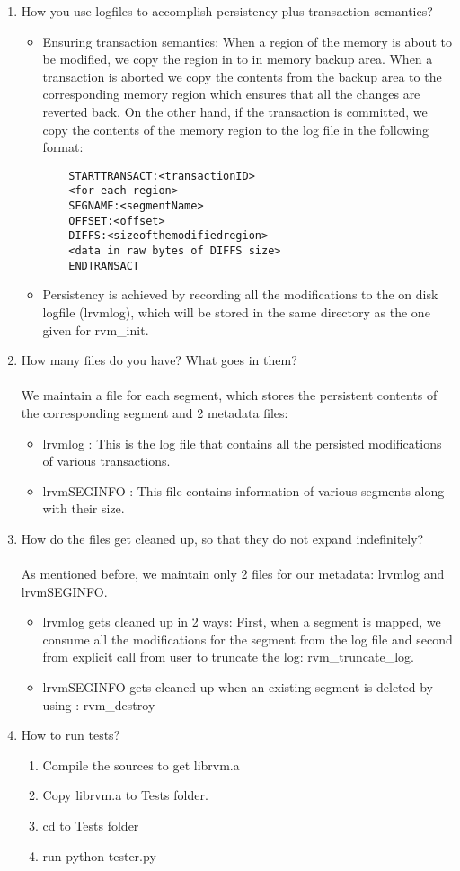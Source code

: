 \documentclass[[10pt]{article}
\begin{document}
\begin{enumerate}
\item How you use logfiles to accomplish persistency plus transaction semantics?
\begin{itemize}
\item Ensuring transaction semantics: When a region of the memory is about to be modified, we copy the region in to in memory backup area. When a transaction is aborted we copy the contents from the backup area to the corresponding memory region which ensures that all the changes are reverted back. On the other hand, if the transaction is committed, we copy the contents of the memory region to the log file in the following format:
\begin{lstlisting}
	STARTTRANSACT:<transactionID>
	<for each region>
	SEGNAME:<segmentName>
	OFFSET:<offset>
	DIFFS:<sizeofthemodifiedregion>
	<data in raw bytes of DIFFS size>
	ENDTRANSACT	 
\end{lstlisting}
\item Persistency is achieved by recording all the modifications to the on disk logfile (lrvmlog), which will be stored in the same directory as the one given for rvm\_init.
\end{itemize}
\item How many files do you have? What goes in them?\\\\
We maintain a file for each segment, which stores the persistent contents of the corresponding segment and 2 metadata files:
\begin{itemize}
\item lrvmlog : This is the log file that contains all the persisted modifications of various transactions.
\item lrvmSEGINFO : This file contains information of various segments along with their size.
\end{itemize}
\item How do the files get cleaned up, so that they do not expand indefinitely?\\\\
	As mentioned before, we maintain only 2 files for our metadata: lrvmlog and lrvmSEGINFO.
\begin{itemize}
\item lrvmlog gets cleaned up in 2 ways: First, when a segment is mapped, we consume all the modifications for the segment from the log file and second from explicit call from user to truncate the log: rvm\_truncate\_log.	
\item lrvmSEGINFO gets cleaned up when an existing segment is deleted by using : rvm\_destroy
\end{itemize}
\item How to run tests?
\begin{itemize}
\begin{enumerate}
\item Compile the sources to get librvm.a
\item Copy librvm.a to Tests folder.
\item cd to Tests folder
\item run python tester.py
\end{enumerate}
\end{itemize}
\end{enumerate}
\end{document}

